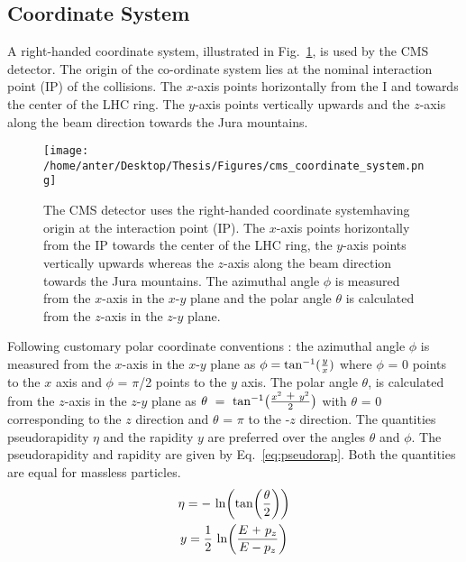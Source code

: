 \subsection{Coordinate System}
A right-handed coordinate system, illustrated in Fig.~\ref{fig:coordinate}, is used by the CMS detector. The origin of the co-ordinate system lies at the nominal interaction point (IP) of the collisions. The $x$-axis points horizontally from the I and towards the center of the LHC ring. The $y$-axis points vertically upwards and the $z$-axis along the beam direction towards the Jura mountains. %
\begin{figure}[!h]
\begin{center} 
\hspace*{-15mm}
\texttt{[image: /home/anter/Desktop/Thesis/Figures/cms\_coordinate\_system.png]}
\vspace{3mm}
\caption[The right-handed coordinate system used by the CMS detector.]{The CMS detector uses the right-handed coordinate system\footnotemark having origin at the interaction point (IP). The $x$-axis points horizontally from the IP towards the center of the LHC ring, the $y$-axis points vertically upwards whereas the $z$-axis along the beam direction towards the Jura mountains. The azimuthal angle $\phi$ is measured from the $x$-axis in the $x$-$y$ plane and the polar angle $\theta$ is calculated from the $z$-axis in the $z$-$y$ plane.}
\label{fig:coordinate}
\end{center}
\end{figure}
Following customary polar coordinate conventions : the azimuthal angle $\phi$ is measured from the $x$-axis in the $x$-$y$ plane as $\phi = {\rm tan^{-1}}(\frac{y}{x})$ where $\phi$ = 0 points to the \plusn $x$ axis and $\phi$ = $\pi$/2 points to the \plusn $y$ axis. The polar angle $\theta$, is calculated from the $z$-axis in the $z$-$y$ plane as $\theta~=~{\rm tan^{-1}}\big(\frac{x^2~\plus y^2}{2}\big)$ with $\theta$ = 0 corresponding to the \plusn $z$ direction and $\theta$ = $\pi$ to the -$z$ direction. The quantities pseudorapidity $\eta$ and the rapidity $y$ are preferred over the angles $\theta$ and $\phi$. The pseudorapidity and rapidity are given by Eq.~\ref{eq:pseudorap}. Both the quantities are equal for massless particles.
\begin{equation}
\begin{gathered}
\eta = -~{\rm ln}\bigg({\rm tan}\bigg(\frac{\theta}{2}\bigg)\bigg)\\
y = \frac{1}{2}~{\rm ln} \bigg(\frac{E~\plus p_z}{E - p_z} \bigg)
\end{gathered}
\label{eq:pseudorap}
\end{equation}
